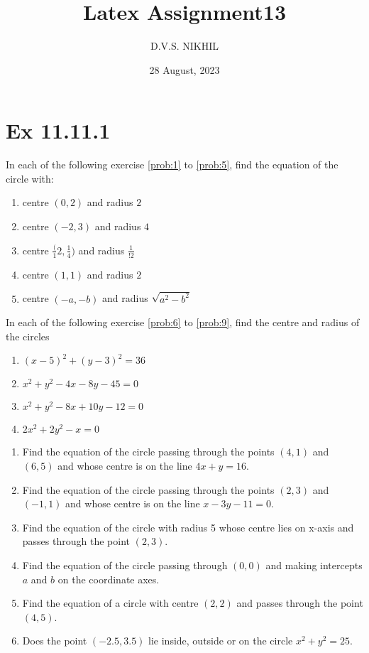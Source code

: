 \documentclass{article}
\theoremstyle{remark}
\begin{document}
\title{Latex Assignment13}
\author{D.V.S. NIKHIL}
\date{28 August, 2023}
\maketitle
\section*{Ex 11.11.1}
In each of the following exercise \ref{prob:1} to \ref{prob:5}, find the equation of the circle with:
\begin{enumerate}[label=\arabic*.,ref=\thesubsection.\theenumi]
\item centre $(0,2)$ and radius $2$ \label{prob:1}
\item centre $(-2,3)$ and radius $4$
\item centre $\frac({1}{2},\frac{1}{4})$ and radius $\frac {1}{!2}$
\item centre $(1,1)$ and radius $2$
\item centre $(-a,-b)$ and radius $\sqrt{a^2-b^2}$  \label{prob:5}
\end{enumerate}
In each of the following exercise \ref{prob:6} to \ref{prob:9}, find the centre and radius of the circles
\begin{enumerate}[resume]
\item $(x-5)^2+(y-3)^2=36$ \label{prob:6}
\item $x^2+y^2-4x-8y-45=0$
\item $x^2+y^2-8x+10y-12=0$
\item $2x^2+2y^2-x=0$ \label{prob:9}
\end{enumerate}
\begin{enumerate}[resume]
\item Find the equation of the circle passing through the points $(4,1)$ and $(6,5)$ and whose centre is on the line $4x+y=16$.
\item Find the equation of the circle passing through the points $(2,3)$ and $(-1,1)$ and whose centre is on the line $x-3y-11=0$.
\item Find the equation of the circle with radius 5 whose centre lies on x-axis and passes through the point $(2,3)$.
\item Find the equation of the circle passing through $(0,0)$ and making intercepts $a$ and $b$ on the coordinate axes.
\item Find the equation of a circle with centre $(2,2)$ and passes through the point $(4,5)$.
\item Does the point $(-2.5,3.5)$ lie inside, outside or on the circle $x^2+y^2=25$.
\end{enumerate}
\end{document}
